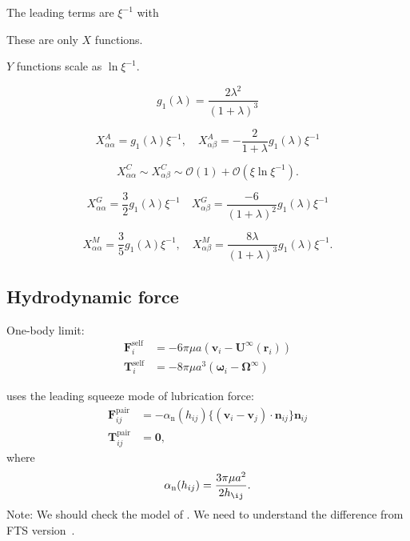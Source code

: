 \documentclass[12pt]{article}
\begin{document}
The leading terms are $\xi^{-1}$ with 




These are only $X$ functions.

$Y$ functions scale as $\ln \xi^{-1}$.


\begin{equation}
 g_1 (\lambda)
= \frac{2\lambda^2}{(1+\lambda)^3}
\end{equation}

\begin{equation}
 X_{\alpha\alpha}^{A}
= 
g_1(\lambda) \xi^{-1}, \quad
 X_{\alpha\beta}^{A}
= 
-\frac{2}{1+\lambda}g_1(\lambda) \xi^{-1}
\end{equation}

\begin{equation}
 X_{\alpha\alpha}^{C} 
\sim
 X_{\alpha\beta}^{C}
\sim
\mathcal{O}(1) + \mathcal{O}(\xi \ln \xi^{-1}).
\end{equation}

\begin{equation}
 X_{\alpha\alpha}^{G}
= \frac{3}{2}g_1(\lambda) \xi^{-1}
\quad 
 X_{\alpha \beta}^{G}
= \frac{-6}{(1+\lambda)^2}
g_1 (\lambda) \xi^{-1}
\end{equation}

\begin{equation}
 X_{\alpha \alpha}^{M}
=
\frac{3}{5} g_1(\lambda) \xi^{-1},
\quad
 X_{\alpha \beta}^{M}
=
\frac{8\lambda}{(1+\lambda)^3} g_1(\lambda) \xi^{-1}.
\end{equation}



\newpage

\subsection*{Hydrodynamic force}

One-body limit:
\begin{align}
 \bm{F}_i^{\mathrm{self}} &= 
-6 \pi \mu a ( \bm{v}_i - \bm{U}^{\infty} (\bm{r}_i) ) \\
 \bm{T}_i^{\mathrm{self}} &= 
-8 \pi \mu a^3 ( \bm{\omega}_i - \bm{\Omega}^{\infty})
\end{align}

\citet{Melrose_2004a} uses 
the leading squeeze mode of lubrication force:
\begin{align}
 \bm{F}_{ij}^{\mathrm{pair}}
&=
- \alpha_{\mathrm{n}}(h_{ij})
\bigl\{
(\bm{v}_i - \bm{v}_j)
\cdot \bm{n}_{ij}
\bigr\}
\bm{n}_{ij} \\
 \bm{T}_{ij}^{\mathrm{pair}}
&=
\bm{0},
\end{align}
where
\begin{equation}
 \alpha_{\mathrm{n}}(h_{ij}) = 
\frac{3 \pi \mu a^2}{2 h_{\ij}}.
\end{equation}
Note: We should check the model of \citet{Ball_1997,Melrose_2004a}.
%
We need to understand the difference from FTS version~\citet{Jeffrey_1992}.
\end{document}
